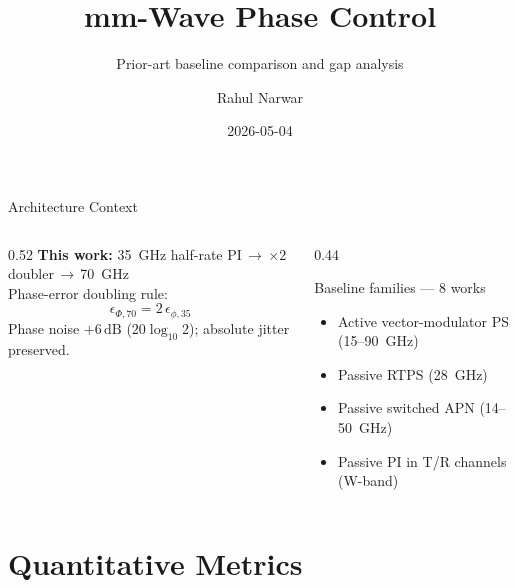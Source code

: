 \documentclass[10pt, aspectratio=169]{beamer}
\title{mm-Wave Phase Control}
\subtitle{Prior-art baseline comparison and gap analysis}
\author{Rahul Narwar}
\date{2026-05-04}
\institute{HIE Lab, University of California, Irvine}
\begin{document}
\maketitle

\begin{frame}{Architecture Context}
\begin{columns}[T]
  \begin{column}{0.52\linewidth}
    \textbf{This work:} \SI{35}{\giga\hertz} half-rate PI\,$\rightarrow$\,$\times2$
    doubler\,$\rightarrow$\,\SI{70}{\giga\hertz}\\[1ex]
    Phase-error doubling rule:
    \[
      \epsilon_{\Phi,70} = 2\,\epsilon_{\phi,35}
    \]
    {\small Phase noise $+6\,\mathrm{dB}$ ($20\log_{10}2$); absolute jitter preserved.}
  \end{column}
  \begin{column}{0.44\linewidth}
    \begin{block}{Baseline families — 8 works}
    \begin{itemize}\small
      \item Active vector-modulator PS (15--90~GHz)
      \item Passive RTPS (28~GHz)
      \item Passive switched APN (14--50~GHz)
      \item Passive PI in T/R channels (W-band)
    \end{itemize}
    \end{block}
  \end{column}
\end{columns}
\end{frame}

\section{Quantitative Metrics}
\end{document}
